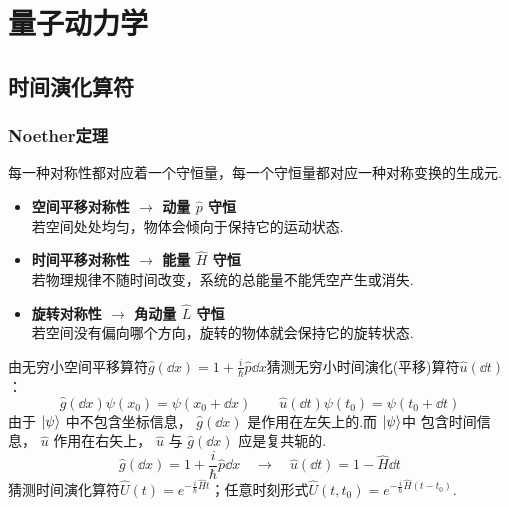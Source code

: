 \chapter{量子动力学}
\section{时间演化算符}
\subsection{Noether定理}
每一种对称性都对应着一个守恒量，每一个守恒量都对应一种对称变换的生成元.
\begin{itemize}
    \item \textbf{空间平移对称性 $\rightarrow$ 动量 $\hat{p}$ 守恒} \\
    若空间处处均匀，物体会倾向于保持它的运动状态.
    \item \textbf{时间平移对称性 $\rightarrow$ 能量 $\hat{H}$ 守恒} \\
    若物理规律不随时间改变，系统的总能量不能凭空产生或消失.
    \item \textbf{旋转对称性 $\rightarrow$ 角动量 $\hat{L}$ 守恒} \\
    若空间没有偏向哪个方向，旋转的物体就会保持它的旋转状态.
\end{itemize}
由无穷小空间平移算符$\hat{g}(\dd{x})=1+\frac{i}{\hbar}\hat{p}\dd{x}$猜测无穷小时间演化(平移)算符$\hat{u}(\dd{t})$：
\[\hat{g}(\dd{x})\psi(x_0) = \psi(x_0+\dd{x}) \qquad \hat{u}(\dd{t})\psi(t_0) = \psi(t_0+\dd{t})\]
由于 $\ket{\psi}$ 中不包含坐标信息， $\hat{g}(\dd{x})$ 是作用在左矢上的.而 $\ket{\psi}$中 包含时间信息， $\hat{u}$ 作用在右矢上， $\hat{u}$ 与 $\hat{g}(\dd{x})$ 应是复共轭的.
\[\hat{g}(\dd{x})=1+\frac{i}{\hbar}\hat{p}\dd{x} \quad \rightarrow \quad \hat{u}(\dd{t})=1-\hat{H}\dd{t}\]
猜测时间演化算符$\hat{U}(t)=e^{-\frac{i}{\hbar}\hat{H}t}$；任意时刻形式$\hat{U}(t,t_0)=e^{-\frac{i}{\hbar}\hat{H}(t-t_0)}$.

